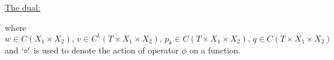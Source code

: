 \documentclass[dvipsnames]{article}
\providecommand{\ip}[1]{\ensuremath \langle #1 \rangle}
\begin{document}
\underline{The dual:}
where $w\in C(X_1\times X_2),\,v\in C^1(T\times X_1\times X_2),\,p_k\in C(T\times X_1\times X_2),\,q\in C(T\times X_1\times X_2)$ and $`\circ'$ is used to denote the action of operator $\phi$ on a function.
\end{document}
